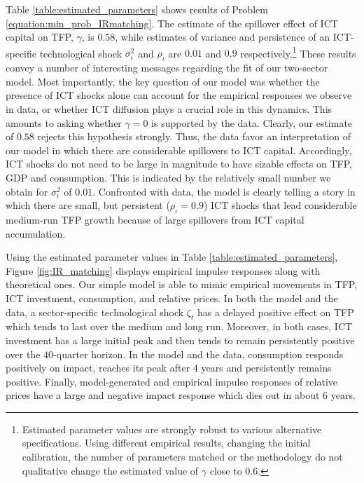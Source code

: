 \documentclass[12pt]{article}
\begin{document}
Table \ref{table:estimated_parameters} shows results of Problem \ref{equation:min_prob_IRmatching}. The estimate of the spillover effect of ICT capital on TFP, $\gamma$, is $0.58$, while estimates of variance and persistence of an ICT-specific technological shock $\sigma^2_{\iota}$ and $\rho_{\iota}$ are $0.01$ and $0.9$ respectively.\footnote{Estimated parameter values are strongly robust to various alternative specifications. Using different empirical results, changing the initial calibration, the number of parameters matched or the methodology do not qualitative change the estimated value of $\gamma$ close to $0.6$.} These results convey a number of interesting messages regarding the fit of our two-sector model. Most importantly, the key question of our model was whether the presence of ICT shocks alone can account for the empirical responses we observe in data, or whether ICT diffusion plays a crucial role in this dynamics. This amounts to asking whether $\gamma = 0$ is supported by the data. Clearly, our estimate of $0.58$ rejects this hypothesis strongly. Thus, the data favor an interpretation of our model in which there are considerable spillovers to ICT capital. Accordingly, ICT shocks do not need to be large in magnitude to have sizable effects on TFP, GDP and consumption. This is indicated by the relatively small number we obtain for $\sigma^2_{\iota}$ of $0.01$. Confronted with data, the model is clearly telling a story in which there are small, but persistent ($\rho_{\iota} = 0.9$) ICT shocks that lead considerable medium-run TFP growth because of large spillovers from ICT capital accumulation.

Using the estimated parameter values in Table \ref{table:estimated_parameters}, Figure \ref{fig:IR_matching} displays empirical impulse responses along with theoretical ones. Our simple model is able to mimic empirical movements in TFP, ICT investment, consumption, and relative prices. In both the model and the data, a sector-specific technological shock $\zeta_t$ has a delayed positive effect on TFP which tends to last over the medium and long run. Moreover, in both cases, ICT investment has a large initial peak and then tends to remain persistently positive over the $40$-quarter horizon. In the model and the data, consumption responds positively on impact, reaches its peak after $4$ years and persistently remains positive. Finally, model-generated and empirical impulse responses of relative prices have a large and negative impact response which dies out in about $6$ years. 
\end{document}
